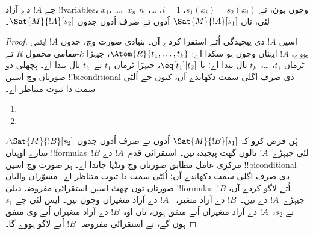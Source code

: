 \documentclass[../../../include/open-logic-section]{subfiles}
\begin{document}
\begin{prop}
جے $!A$ دے آزاد !!{variable}s، $x_1$، \dots،~$x_n$ وچوں ہون، تے
$s_1(x_i) = s_2(x_i)$، $i = 1$، \dots،~$n$ لئی، تاں
$\Sat{M}{!A}[s_1]$ اُدوں تے صرف اُدوں جدوں $\Sat{M}{!A}[s_2]$۔
\end{prop}

\begin{proof}
اسیں $!A$ دی پیچیدگی اُتے استقرا کردے آں۔ بنیادی صورت وچ، جدوں
$!A$ ایٹمی ہووے، $!A$ ایہناں وچوں ہو سکدا اے:
$\Atom{R}{t_1, \dots, t_k}$، جیہڑا $k$-مقامی محمول $R$ تے
ٹرماں $t_1$، \dots،~$t_k$ نال بندا اے؛ یا $\eq[t_1][t_2]$،
جیہڑا ٹرماں $t_1$ تے~$t_2$ نال بندا اے۔ پچھلی دو صورتاں وچ اسیں !!{biconditional}
دی صرف اگلی سمت دکھاندے آں، کیوں جے اُلٹی سمت دا ثبوت
متناظر اے۔

\begin{enumerate}


\item
\item
\end{enumerate}

ہُن فرض کرو کہ $\Sat{M}{!B}[s_1]$ اُدوں تے صرف اُدوں جدوں
$\Sat{M}{!B}[s_2]$، سارے اوہناں !!{formula}s~$!B$ لئی
جیہڑے~$!A$ نالوں گھٹ پیچیدہ نیں۔ استقرائی قدم~$!A$ دے مرکزی عامل مطابق
صورتاں وچ ونڈیا جاندا اے۔ ہر صورت وچ اسیں !!{biconditional}
دی صرف اگلی سمت دکھاندے آں؛ اُلٹی سمت دا ثبوت متناظر اے۔
مسوّراں والیاں صورتاں توں چھٹ اسیں استقرائی مفروضہ ذیلی-!!{formula}s~$!B$
اُتے لاگو کردے آں، جیہڑے~$!A$ دے نیں۔~$!B$ دے آزاد متغیر،
~$!A$ دے آزاد متغیراں وچوں نیں۔ ایس لئی جے $s_1$ تے $s_2$،~$!A$
دے آزاد متغیراں اُتے متفق ہون، تاں اوہ~$!B$ دے آزاد متغیراں
اُتے وی متفق ہون گے، تے استقرائی مفروضہ~$!B$ اُتے لاگو ہووے گا۔


\end{proof}
\end{document}
